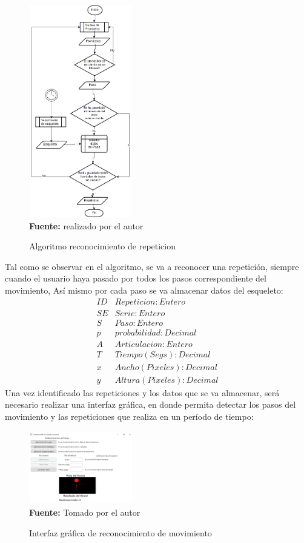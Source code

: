 \documentclass[twoside,twocolumn]{article}
\begin{document}
\begin{figure}[H]
	\caption{Algoritmo reconocimiento de repeticion}
	\label{fig:algoritmo}
	\centering
	\includegraphics[width=170px,height=350px]{img/algoritmo.png} \\
	\textbf{Fuente:} realizado por el autor
\end{figure}
\medbreak 
Tal como se observar en el algoritmo, se va a reconocer una repetición, siempre cuando el usuario haya pasado por todos los pasos correspondiente del movimiento, Así mismo por cada paso se va almacenar datos del esqueleto:
\[
 \begin{matrix}
  ID & Repeticion:Entero                   \\
  SE & Serie:Entero                        \\
  S & Paso:Entero                          \\
  p & probabilidad:Decimal                 \\
  A & Articulacion:Entero                  \\
  T & Tiempo(Segs):Decimal                 \\
  x & Ancho(Pixeles):Decimal               \\
  y & Altura(Pixeles):Decimal
 \end{matrix}
\]
Una vez identificado las repeticiones y los datos que se va almacenar, será necesario realizar una interfaz gráfica, en donde permita detectar los pasos del movimiento y las repeticiones que realiza en un período de tiempo:
\begin{figure}[H]
	\caption{Interfaz gráfica de reconocimiento de movimiento}
	\label{fig:resultados}
	\centering
	\includegraphics[width=170px,height=120px]{img/evaluation.PNG} \\
	\textbf{Fuente:} Tomado por el autor
\end{figure}
\end{document}
